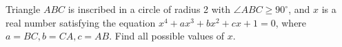 Triangle $ABC$ is inscribed in a circle of radius 2 with $\angle ABC \geq 90^\circ$, and $x$ is a real number satisfying the equation $x^4 + ax^3 + bx^2 + cx + 1 = 0$, where $a=BC,b=CA,c=AB$. Find all possible values of $x$.